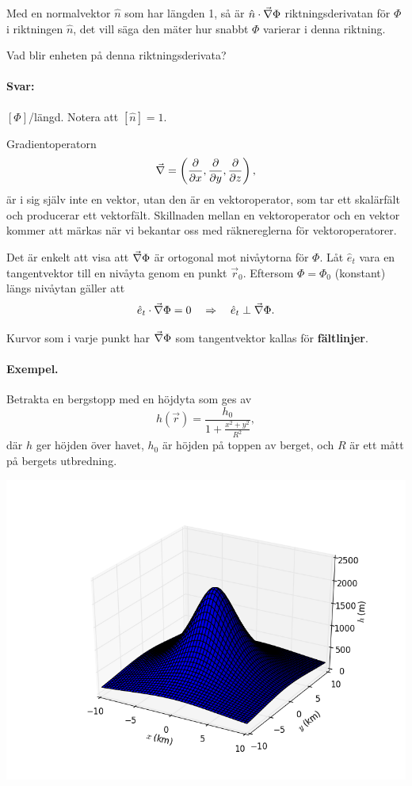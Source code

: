 \documentclass[%
oneside,                 %
final,                   %
10pt]{article}
\newenvironment{notice_mdfboxadmon}[1][]{
\begin{notice_mdfboxmdframed}[frametitle=#1]
}
{
\end{notice_mdfboxmdframed}
}
\begin{document}
Med en normalvektor $\hat{n}$ som har längden 1, så är $\hat{n} \cdot \vec{\nabla} \Phi$ riktningsderivatan för $\Phi$ i riktningen $\hat{n}$, det vill säga den mäter hur snabbt $\Phi$ varierar i denna riktning. 


\begin{notice_mdfboxadmon}[Riktningsderivata]
Vad blir enheten på denna riktningsderivata?
\paragraph{Svar:}
$[\Phi]$/längd. Notera att $[\hat{n}]=1$.
\end{notice_mdfboxadmon} %



Gradientoperatorn
\begin{equation}
  \vec{\nabla} = \left(\frac{\partial}{\partial x}, \frac{\partial}{\partial y},
\frac{\partial}{\partial z}\right),
\end{equation}
är i sig själv inte en vektor, utan den är en vektoroperator, som tar ett skalärfält och producerar ett vektorfält.  Skillnaden mellan en vektoroperator och en vektor kommer att märkas när vi bekantar oss med räknereglerna för vektoroperatorer.

Det är enkelt att visa att $\vec{\nabla} \Phi$ är ortogonal mot nivåytorna för $\Phi$.  Låt $\hat{e}_t$ vara en tangentvektor till en nivåyta genom en punkt $\vec{r}_0$. Eftersom $\Phi = \Phi_0$ (konstant) längs nivåytan gäller att 
\[
\hat{e}_t \cdot \vec{\nabla} \Phi = 0 \quad \Rightarrow \quad \hat{e}_t \perp \vec{\nabla} \Phi.
\]

Kurvor som i varje punkt har $\vec{\nabla} \Phi$ som tangentvektor kallas för \textbf{fältlinjer}.

\paragraph{Exempel.}
Betrakta en bergstopp med en höjdyta som ges av
\begin{equation}
h(\vec{r}) = \frac{h_0}{1+\frac{x^2+y^2}{R^2}},
\end{equation}
där $h$ ger höjden över havet, $h_0$ är höjden på toppen av berget, och $R$ är ett mått på bergets utbredning.




\vspace{6mm}

\centerline{\includegraphics[width=0.8\linewidth]{fig/hojd_surface.png}}
\end{document}
